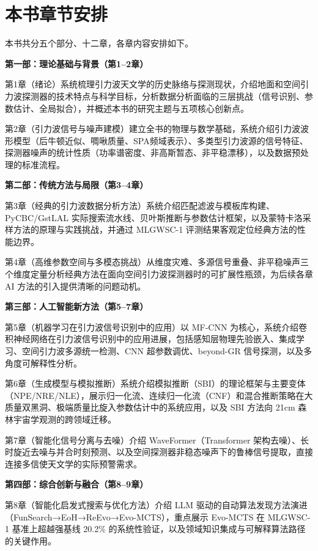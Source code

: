 \section{本书章节安排}

本书共分五个部分、十二章，各章内容安排如下。

\textbf{第一部：理论基础与背景（第1--2章）}

第1章（绪论）系统梳理引力波天文学的历史脉络与探测现状，介绍地面和空间引力波探测器的技术特点与科学目标，分析数据分析面临的三层挑战（信号识别、参数估计、全局拟合），并概述本书的研究主题与五项核心创新点。

第2章（引力波信号与噪声建模）建立全书的物理与数学基础，系统介绍引力波波形模型（后牛顿近似、啁啾质量、SPA频域表示）、多类型引力波源的信号特征、探测器噪声的统计性质（功率谱密度、非高斯暂态、非平稳漂移），以及数据预处理的标准流程。

\textbf{第二部：传统方法与局限（第3--4章）}

第3章（经典的引力波数据分析方法）系统介绍匹配滤波与模板库构建、PyCBC/GstLAL 实际搜索流水线、贝叶斯推断与参数估计框架，以及蒙特卡洛采样方法的原理与实践挑战，并通过 MLGWSC-1 评测结果客观定位经典方法的性能边界。

第4章（高维参数空间与多模态挑战）从维度灾难、多源信号重叠、非平稳噪声三个维度定量分析经典方法在面向空间引力波探测器时的可扩展性瓶颈，为后续各章 AI 方法的引入提供清晰的问题动机。

\textbf{第三部：人工智能新方法（第5--7章）}

第5章（机器学习在引力波信号识别中的应用）以 MF-CNN 为核心，系统介绍卷积神经网络在引力波信号识别中的应用进展，包括感知层物理先验嵌入、集成学习、空间引力波多源统一检测、CNN 超参数调优、beyond-GR 信号探测，以及多角度可解释性分析。

第6章（生成模型与模拟推断）系统介绍模拟推断（SBI）的理论框架与主要变体（NPE/NRE/NLE），展示归一化流、连续归一化流（CNF）和混合推断策略在大质量双黑洞、极端质量比旋入参数估计中的系统应用，以及 SBI 方法向 21cm 森林宇宙学观测的跨领域迁移。

第7章（智能化信号分离与去噪）介绍 WaveFormer（Transformer 架构去噪）、长时旋近去噪与并合时刻预测、以及空间探测器非稳态噪声下的鲁棒信号提取，直接连接多信使天文学的实际预警需求。

\textbf{第四部：综合创新与融合（第8--9章）}

第8章（智能化启发式搜索与优化方法）介绍 LLM 驱动的自动算法发现方法演进（FunSearch→EoH→ReEvo→Evo-MCTS），重点展示 Evo-MCTS 在 MLGWSC-1 基准上超越强基线 20.2\% 的系统性验证，以及领域知识集成与可解释算法路径的关键作用。

